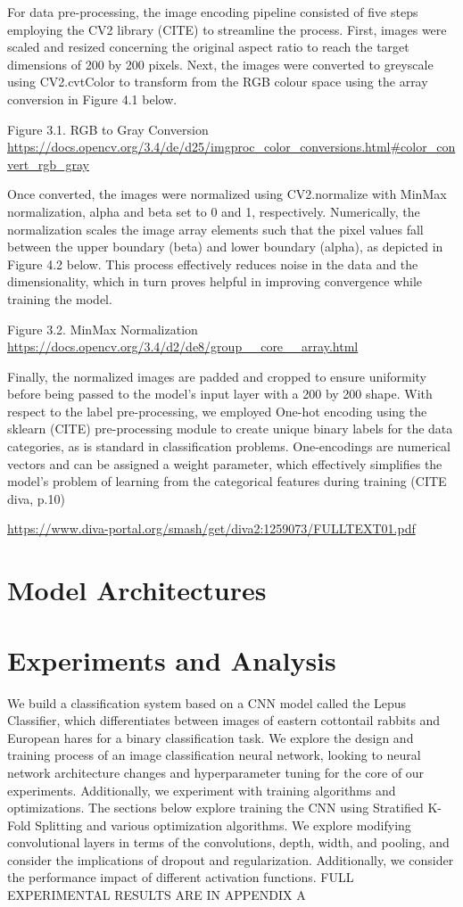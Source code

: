 \documentclass{article}
\begin{document}
For data pre-processing, the image encoding pipeline consisted of five steps employing the CV2 library (CITE) to streamline the process. First, images were scaled and resized concerning the original aspect ratio to reach the target dimensions of 200 by 200 pixels. Next, the images were converted to greyscale using CV2.cvtColor to transform from the RGB colour space using the array conversion in Figure 4.1 below. 


Figure 3.1. RGB to Gray Conversion \url{https://docs.opencv.org/3.4/de/d25/imgproc_color_conversions.html#color_convert_rgb_gray}

Once converted, the images were normalized using CV2.normalize with MinMax normalization, alpha and beta set to 0 and 1, respectively. Numerically, the normalization scales the image array elements such that the pixel values fall between the upper boundary (beta) and lower boundary (alpha), as depicted in Figure 4.2 below. This process effectively reduces noise in the data and the dimensionality, which in turn proves helpful in improving convergence while training the model.

Figure 3.2. MinMax Normalization 
\url{https://docs.opencv.org/3.4/d2/de8/group__core__array.html}

Finally, the normalized images are padded and cropped to ensure uniformity before being passed to the model's input layer with a 200 by 200 shape. With respect to the label pre-processing, we employed One-hot encoding using the sklearn (CITE) pre-processing module to create unique binary labels for the data categories, as is standard in classification problems. One-encodings are numerical vectors and can be assigned a weight parameter, which effectively simplifies the model's problem of learning from the categorical features during training (CITE diva, p.10) 

\url{https://www.diva-portal.org/smash/get/diva2:1259073/FULLTEXT01.pdf}


\section{Model Architectures}


\section{Experiments and Analysis}
We build a classification system based on a CNN model called the Lepus Classifier, which differentiates between images of eastern cottontail rabbits and European hares for a binary classification task. We explore the design and training process of an image classification neural network, looking to neural network architecture changes and hyperparameter tuning for the core of our experiments. Additionally, we experiment with training algorithms and optimizations. The sections below explore training the CNN using Stratified K-Fold Splitting and various optimization algorithms. We explore modifying convolutional layers in terms of the convolutions, depth, width, and pooling, and consider the implications of dropout and regularization. Additionally, we consider the performance impact of different activation functions.  FULL EXPERIMENTAL RESULTS ARE IN APPENDIX A
\end{document}
